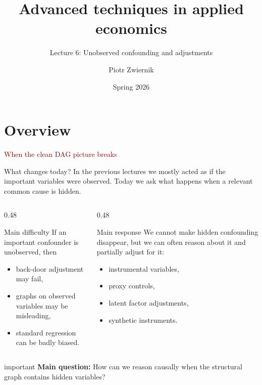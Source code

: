 \documentclass[dvipsnames,aspectratio=169,handout]{beamer}
\title{Advanced techniques in applied economics}
\subtitle{Lecture 6: Unobserved confounding and adjustments}
\author{Piotr Zwiernik}
\date{Spring 2026}
\begin{document}

\begin{frame}
\titlepage
\end{frame}


\section{Overview}

\begin{frame}{}
\begin{center}
{\huge \textcolor{DarkRed}{When the clean DAG picture breaks}}
\end{center}
\end{frame}

\begin{frame}{What changes today?}
In the previous lectures we mostly acted as if the important variables were observed.
Today we ask what happens when a relevant common cause is hidden.

\begin{columns}[T]
\begin{column}{0.48\textwidth}
\begin{block}{Main difficulty}
If an important confounder is unobserved, then
\begin{itemize}
    \item back-door adjustment may fail,
    \item graphs on observed variables may be misleading,
    \item standard regression can be badly biased.
\end{itemize}
\end{block}
\end{column}
\begin{column}{0.48\textwidth}
\begin{block}{Main response}
We cannot make hidden confounding disappear,
but we can often reason about it and partially adjust for it:
\begin{itemize}
    \item instrumental variables,
    \item proxy controls,
    \item latent factor adjustments,
    \item synthetic instruments.
\end{itemize}
\end{block}
\end{column}
\end{columns}

\begin{beamercolorbox}[wd=\textwidth,sep=8pt,center,rounded=true,shadow=true]{important}
\textbf{Main question:}
How can we reason causally when the structural graph contains hidden variables?
\end{beamercolorbox}
\end{frame}
\end{document}
